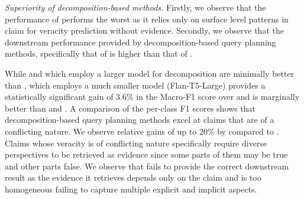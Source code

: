 \emph{Superiority of decomposition-based methods.} Firstly, we observe that the performance of \robertaclaimnoev{} performs the worst as it relies only on surface level patterns in claim for veracity prediction without evidence. Secondly, we observe that the downstream performance provided by decomposition-based query planning methods, specifically that of \qgen{} is higher than that of \claimonly{}. 


While \pgmfc{} and \claimdecomp{} which employ a larger model \gptt{} for decomposition are minimally better than \claimonly{}, \qgen{} which employs a much smaller model (Flan-T5-Large) provides a statistically significant gain of 3.6\% in the Macro-F1 score over \claimonly{} and is marginally better than \pgmfc{} and \claimdecomp{}. A comparison of the per-class F1 scores shows that decomposition-based query planning methods excel at claims that are of a conflicting nature. We observe relative gains of up to 20\% by \pgmfc{} compared to \claimonly{}. Claims whose veracity is of conflicting nature specifically require diverse perspectives to be retrieved as evidence since some parts of them may be true and other parts false. We observe that \claimonly{} fails to provide the correct downstream result as the evidence it retrieves depends only on the claim and is too homogeneous failing to capture multiple explicit and implicit aspects.




